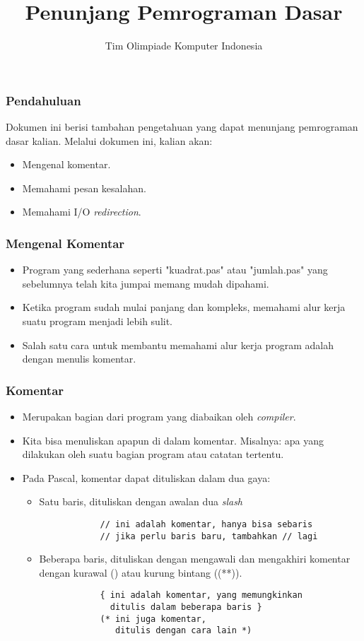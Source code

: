 \documentclass{beamer}
\title{Penunjang Pemrograman Dasar}
\author{Tim Olimpiade Komputer Indonesia}
\begin{document}
\begin{frame}
\titlepage
\end{frame}

\begin{frame}
\frametitle{Pendahuluan}
Dokumen ini berisi tambahan pengetahuan yang dapat menunjang pemrograman dasar kalian.\newline
Melalui dokumen ini, kalian akan:
\begin{itemize}
	\item Mengenal komentar.
	\item Memahami pesan kesalahan.
	\item Memahami I/O \textit{redirection}.
\end{itemize}
\end{frame}

\begin{frame}
\frametitle{Mengenal Komentar}
\begin{itemize}
	\item Program yang sederhana seperti "kuadrat.pas" atau "jumlah.pas" yang sebelumnya telah kita jumpai memang mudah dipahami.
	\item Ketika program sudah mulai panjang dan kompleks, memahami alur kerja suatu program menjadi lebih sulit.
	\item Salah satu cara untuk membantu memahami alur kerja program adalah dengan menulis komentar.
\end{itemize}
\end{frame}

\begin{frame}[fragile]
\frametitle{Komentar}
\begin{itemize}
	\item Merupakan bagian dari program yang diabaikan oleh \textit{compiler}.
	\item Kita bisa menuliskan apapun di dalam komentar. Misalnya: apa yang dilakukan oleh suatu bagian program atau catatan tertentu.
	\item Pada Pascal, komentar dapat dituliskan dalam dua gaya:
	\begin{itemize}
		\item Satu baris, dituliskan dengan awalan dua \textit{slash}
		\begin{lstlisting}
			// ini adalah komentar, hanya bisa sebaris
			// jika perlu baris baru, tambahkan // lagi
		\end{lstlisting}
		\item Beberapa baris, dituliskan dengan mengawali dan mengakhiri komentar dengan kurawal ({}) atau kurung bintang ((**)). 
		\begin{lstlisting}
			{ ini adalah komentar, yang memungkinkan 
			  ditulis dalam beberapa baris }
			(* ini juga komentar, 
			   ditulis dengan cara lain *)
		\end{lstlisting}
	\end{itemize}
\end{itemize}
\end{frame}
\end{document}
